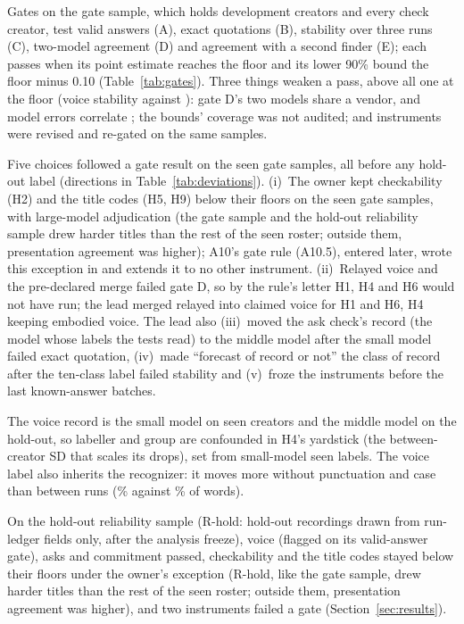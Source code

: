 Gates on the gate sample, which holds development creators and every check creator, test valid answers (A), exact quotations (B), stability over three runs (C),
two-model agreement (D) and agreement with a second finder (E); each passes when its point estimate reaches the floor
and its lower 90\% bound the floor minus 0.10 (Table~\ref{tab:gates}). Three things weaken a pass, above all one at the
floor (voice stability \VoiceGateC{} against \VoiceGateCFloor): gate D's two models share a vendor, and model errors
correlate \cite{kim2025correlated}; the bounds' coverage was not audited; and instruments were revised and re-gated on
the same samples.

Five choices followed a gate result on the seen gate samples, all before any hold-out label (directions in
Table~\ref{tab:deviations}).
(i)~The owner kept checkability (H2) and the title codes (H5, H9) below their floors on the seen gate samples, with
large-model adjudication (the gate sample and the hold-out reliability sample drew harder titles than the rest of the
seen roster; outside them, presentation agreement was higher); A10's gate rule (A10.5), entered later, wrote this exception in and extends it to no other
instrument. (ii)~Relayed voice and the pre-declared merge failed gate D, so by the rule's letter H1, H4 and H6 would
not have run; the lead merged relayed into claimed voice for H1 and H6, H4 keeping embodied voice. The lead also
(iii)~moved the ask check's record (the model whose labels the tests read) to the middle model after the small model failed exact quotation, (iv)~made
``forecast of record or not'' the class of record after the ten-class label failed stability and (v)~froze the
instruments before the last known-answer batches.

The voice record is the small model on seen creators and the middle model on the hold-out, so labeller and group are
confounded in H4's yardstick (the between-creator SD that scales its drops), set from small-model seen labels. The voice label also inherits the recognizer: it moves
more without punctuation and case than between runs (\VoicePunctMovePct\% against \VoiceRunMovePct\% of words).

On the hold-out reliability sample (R-hold: \RholdRecordings{} hold-out recordings drawn from run-ledger fields only,
after the analysis freeze), voice (flagged on its valid-answer gate), asks and commitment passed, checkability and the
title codes stayed below their floors under the owner's exception (R-hold, like the gate sample, drew harder titles
than the rest of the seen roster; outside them, presentation agreement was higher), and two instruments failed a
gate (Section~\ref{sec:results}).

